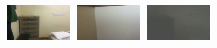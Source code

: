 \documentclass[letterpaper, 10 pt, conference]{ieeeconf}  %
\begin{document}
\begin{figure}[htbp]
\begin{tabular}{ccc}
 \includegraphics[width=\imgW,height=\imgH]{rio-q6} &
 \includegraphics[width=\imgW,height=\imgH]{rio-rf6} &
 \includegraphics[width=\imgW,height=\imgH]{rio-r6-2} \\
 

\end{tabular}
\end{figure}
\end{document}
